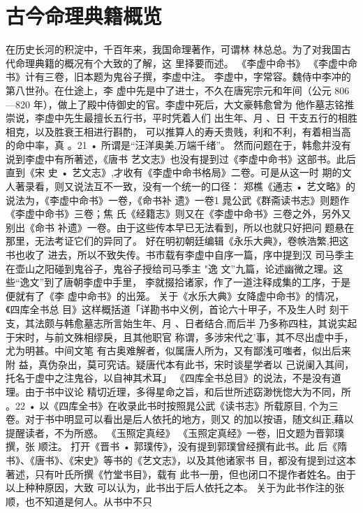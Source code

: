 \section{古今命理典籍概览}

在历史长河的积淀中，千百年来，我国命理著作，可谓林
林总总。为了对我国古代命理典籍的概况有个大致的了解，这
里择要而述。
《李虚中命书》
《李虚中命书》计有三卷，旧本题为鬼谷子撰，李虚中注。
李虚中，字常容。魏侍中李冲的第八世孙。在仕途上，李
虚中先是中了进士，不久在唐宪宗元和年间（公元 806—820
年），做上了殿中侍御史的官。李虚中死后，大文豪韩愈曾为
他作墓志铭推崇说，李虚中先生最擅长五行书，平时凭着人们
出生年、月 、日 干支五行的相胜相克，以及胜衰王相进行斟酌，
可以推算人的寿夭贵贱，利和不利，有着相当高的命中率，真
。21 •
所谓是“汪洋奥美,万端千绪”。
然而问题在于，韩愈并没有说到李虚中有所著述，《唐书
艺文志》也没有提到过《李虚中命书》这部书。此后直到《宋
史 • 艺文志》,才收有《李虚中命书格局》二卷。可是从这一时
期的文人著录看，则又说法互不一致，没有一个统一的口径：
郑樵《通志 • 艺文略》的说法为，《李虚中命书》一卷，《命书补
遗》一卷1 晁公武《群斋读书志》则题作《李虚中命书》三卷；焦
氏《经籍志》则又在《李虚中命书》三卷之外，另外又别出《命书
补遗》一卷。由于这些传本早已无法看到，所以也就只好把问
题悬在那里，无法考证它们的异同了。
好在明初朝廷编辑《永乐大典》，卷帙浩繁,把这书也收了
进去，所以不致失传。书市载有李虚中自序一篇，序中提到汉
司马季主在壶山之阳碰到鬼谷子，鬼谷子授给司马季主 "逸
文”九篇，论述幽微之理。这些“逸文”到了唐朝李虚中手里，
李就掇拾诸家，作了一道注释成集的工序，于是便就有了《李
虚中命书》的出笼。
关于《水乐大典》女降虚中命书》的情况，《四库全书总
目》这样概括道「详勘书中义例，首论六十甲子，不及生人时
刻干支，其法颇与韩愈墓志所言始生年、月 、日者结合,而后半
乃多称四柱，其说实起于宋时，与前文殊相缪戾，且其他职官
称谓，多涉宋代之'事，其不尽出虚中手，尤为明甚。中间文笔
有古奥难解者，似属唐人所为，又有鄙浅可嗤者，似出后来附
益，真伪杂出，莫可究诘。疑唐代本有此书，宋时谈星学者以
己说阑入其间，托名于虚中之注鬼谷，以自神其术耳」
《四库全书总目》的说法，不是没有道理。由于书中议论
精切近理，多得星命之旨，和后世所述窈渺恍惚大为不同，所
。22 •
以《四库全书》在收录此书时按照晁公武《读书志》所载原目,
个为三卷。对于书中明显可以看出是后人依托的地方，则又
的加以按语，随文纠正,藉以提醒读者，不为所惑。
《玉照定真经》
《玉照定真经》一卷，旧文题为晋郭璞撰，张 顺注。
打开《晋书 • 郭璞传》，没有提到郭璞曾经撰有此书。此
后《隋书》、《唐书》、《宋史》等书的《艺文志》，以及其他诸家书
目，都没有提到过这本著述，只有叶氏所撰《竹堂书目》，载有
此书一册，但也闭口不提作者姓名。由于以上种种原因，大致
可以认为，此书出于后人依托之本。
关于为此书作注的张顺，也不知道是何人。从书中不只
